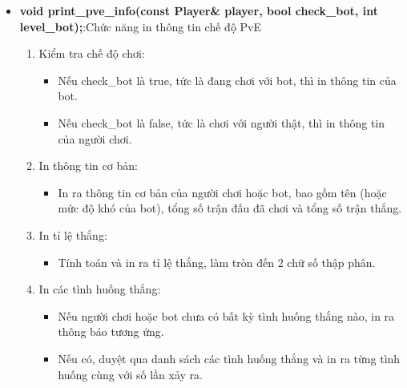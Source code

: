 \documentclass{article}
\begin{document}
\begin{itemize}
    \item \textbf{void print\_pve\_info(const Player\& player, bool check\_bot, int level\_bot);}:Chức năng in thông tin chế độ PvE
    \begin{description}
            \begin{enumerate}
            \item Kiểm tra chế độ chơi:
                \begin{itemize}
                    \item Nếu check\_bot là true, tức là đang chơi với bot, thì in thông tin của bot.
                \item Nếu check\_bot là false, tức là chơi với người thật, thì in thông tin của người chơi.
                \end{itemize}
            \item In thông tin cơ bản:
                \begin{itemize}
                    \item In ra thông tin cơ bản của người chơi hoặc bot, bao gồm tên (hoặc mức độ khó của bot), tổng số trận đấu đã chơi và tổng số trận thắng.
                \end{itemize}
            \item In tỉ lệ thắng:
                \begin{itemize}
                    \item Tính toán và in ra tỉ lệ thắng, làm tròn đến 2 chữ số thập phân.
                \end{itemize}
            \item In các tình huống thắng:
                \begin{itemize}
                    \item Nếu người chơi hoặc bot chưa có bất kỳ tình huống thắng nào, in ra thông báo tương ứng.
                    \item Nếu có, duyệt qua danh sách các tình huống thắng và in ra từng tình huống cùng với số lần xảy ra.
                \end{itemize}
        \end{enumerate}
    \end{description}
    

\end{itemize}
\end{document}
